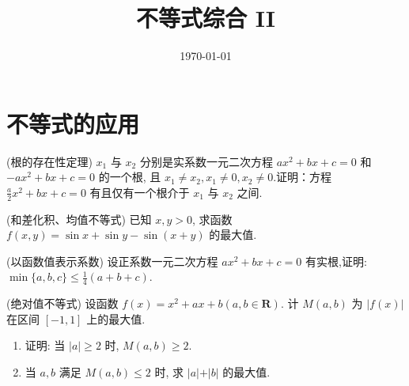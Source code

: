 \documentclass[a4paper , final]{ctexart}
\title{不等式综合 II}
\date{\today}
\newenvironment{problem}[1]{%
  \item #1
  \par
  \vspace{8cm}
}{}
\begin{document}
\maketitle


\section*{不等式的应用}
 
\begin{problems}
  \begin{problem}
  {(根的存在性定理)
  $x_1$ 与 $x_2$ 分别是实系数一元二次方程 $ax^2 + bx + c = 0$ 和 $-ax^2 + bx + c = 0$ 的一个根, 且 $x_1 \ne x_2, x_1 \ne 0, x_2 \ne 0$.证明：方程 $\frac{a}{2}x^2 + bx + c = 0$ 有且仅有一个根介于 $x_1$ 与 $x_2$ 之间.
  }
  \end{problem}

  \begin{problem}
  {(和差化积、均值不等式)
  已知 $x, y > 0$, 求函数 $f(x,y) = \sin x + \sin y - \sin(x+y)$ 的最大值.
  }
  \end{problem}

  \begin{problem}
    {(以函数值表示系数)
      设正系数一元二次方程 $ax^2 + bx + c = 0$ 有实根,证明: $\min\{a,b,c\}\leq\frac{1}{4}(a+b+c)$.
    }
  \end{problem}

  \begin{problem}
    {(绝对值不等式)
      设函数 $f(x) = x^2+ax+b(a,b\in\mathbf{R})$. 计 $M(a,b)$ 为 $\vert f(x)\vert$ 在区间 $[-1,1]$ 上的最大值.
      \begin{enumerate}[label=(\arabic*)]
        \item 证明: 当 $\vert a\vert\ge 2$ 时, $M(a,b) \geq 2$.
        \item 当 $a,b$ 满足 $M(a,b)\leq 2$ 时, 求 $\vert a\vert + \vert b\vert$ 的最大值.
      \end{enumerate} 
    }
  \end{problem}
\end{problems}
\end{document}
